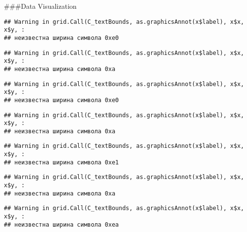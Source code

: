 \documentclass[
]{article}
\newenvironment{Shaded}{\begin{snugshade}}{\end{snugshade}}
\newcommand{\DataTypeTok}[1]{\textcolor[rgb]{0.13,0.29,0.53}{#1}}
\newcommand{\KeywordTok}[1]{\textcolor[rgb]{0.13,0.29,0.53}{\textbf{#1}}}
\newcommand{\NormalTok}[1]{#1}
\newcommand{\OperatorTok}[1]{\textcolor[rgb]{0.81,0.36,0.00}{\textbf{#1}}}
\newcommand{\StringTok}[1]{\textcolor[rgb]{0.31,0.60,0.02}{#1}}
\begin{document}
\#\#\#Data Visualization

\begin{Shaded}
\end{Shaded}

\begin{verbatim}
## Warning in grid.Call(C_textBounds, as.graphicsAnnot(x$label), x$x, x$y, :
## неизвестна ширина символа 0xe0
\end{verbatim}

\begin{verbatim}
## Warning in grid.Call(C_textBounds, as.graphicsAnnot(x$label), x$x, x$y, :
## неизвестна ширина символа 0xa
\end{verbatim}

\begin{verbatim}
## Warning in grid.Call(C_textBounds, as.graphicsAnnot(x$label), x$x, x$y, :
## неизвестна ширина символа 0xe0
\end{verbatim}

\begin{verbatim}
## Warning in grid.Call(C_textBounds, as.graphicsAnnot(x$label), x$x, x$y, :
## неизвестна ширина символа 0xa
\end{verbatim}

\begin{verbatim}
## Warning in grid.Call(C_textBounds, as.graphicsAnnot(x$label), x$x, x$y, :
## неизвестна ширина символа 0xe1
\end{verbatim}

\begin{verbatim}
## Warning in grid.Call(C_textBounds, as.graphicsAnnot(x$label), x$x, x$y, :
## неизвестна ширина символа 0xa
\end{verbatim}

\begin{verbatim}
## Warning in grid.Call(C_textBounds, as.graphicsAnnot(x$label), x$x, x$y, :
## неизвестна ширина символа 0xea
\end{verbatim}
\end{document}
